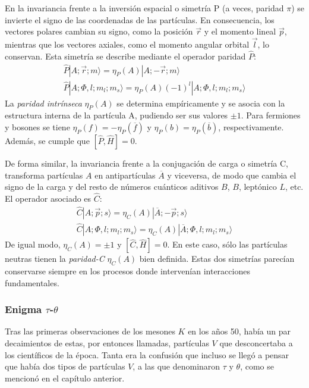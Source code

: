 En la invariancia frente a la inversión espacial o simetría P (a veces, paridad $\pi$) se invierte el signo de las coordenadas de las partículas. En consecuencia, los vectores polares cambian su signo, como la posición $\vec{r}$ y el momento lineal $\vec{p}$, mientras que los vectores axiales, como el momento angular orbital $\vec{l}$, lo conservan. Esta simetría se describe mediante el operador paridad $\hat{P}$:
\begin{equation}
\begin{gathered}
\hat{P}\left| A;\vec{r};m\rangle =\eta_P\left(A\right) \right| A; -\vec{r}; m \rangle \\  \hat{P}| A; \Phi, l; m_{l}; m_{s} \rangle =\eta_P \left( A\right) \left( -1\right)^{l} | A;\Phi, l; m_{l}; m_s\rangle 
\end{gathered}
\end{equation}
La \textit{paridad intrínseca} $\eta_P(A)$ se determina empíricamente y se asocia con la estructura interna de la partícula A, pudiendo ser sus valores $\pm 1$. Para fermiones y bosones se tiene $\eta_P(f)=-\eta_P \left(\overline{f}\right)$ y $\eta_P(b)=\eta_P \left(\overline{b}\right)$, respectivamente. Además, se cumple que $[\hat{P}, \widehat{H}]=0$.


De forma similar, la invariancia frente a la conjugación de carga o simetría C, transforma partículas $A$ en antipartículas $\overline{A}$ y viceversa, de modo que cambia el signo de la carga y del resto de números cuánticos aditivos $B$, $B$, leptónico $L$, etc. El operador asociado es $\hat{C}$:
\begin{equation}
\begin{gathered}
\hat{C}\left| A;\vec{p};s\rangle =\eta_C\left(A\right) \right| \overline{A}; -\vec{p}; s \rangle \\ \hat{C}| A; \Phi, l; m_{l}; m_{s} \rangle =\eta_C \left( A\right) | \overline{A};\Phi, l; m_{l}; m_s\rangle 
\end{gathered}
\end{equation}
De igual modo, $\eta_C(A)=\pm 1$ y $[\hat{C}, \widehat{H}]=0$. En este caso, sólo las partículas neutras tienen la \textit{paridad-C} $\eta_C(A)$ bien definida.
Estas dos simetrías parecían conservarse siempre en los procesos donde intervenían interacciones fundamentales.

\subsubsection{Enigma $\tau$-$\theta$}
Tras las primeras observaciones de los mesones $K$ en los años 50, había un par decaimientos de estas, por entonces llamadas, partículas $V$ que desconcertaba a los científicos de la época. Tanta era la confusión que incluso se llegó a pensar que había dos tipos de partículas $V$, a las que denominaron $\tau$ y $\theta$, como se mencionó en el capítulo anterior. 

